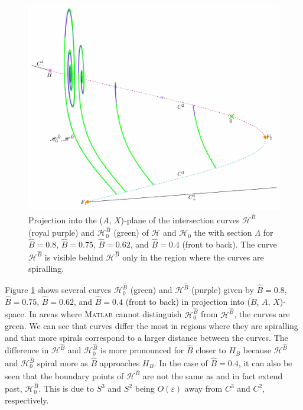 \documentclass{ws-ijbc}
\begin{document}
\begin{figure}[H]
\centering
\includegraphics[]{./figures/MKMO_15.pdf}
\caption{Projection into the ($A$, $X$)-plane of the intersection curves $\mathscr{H}^{\widehat{B}}$ (royal purple) and $\mathscr{H}_0^{\widehat{B}}$ (green) of $\mathscr{H}$ and $\mathscr{H}_0$ the with section $\Lambda$ for $\widehat{B}=0.8$, $\widehat{B}=0.75$, $\widehat{B}=0.62$, and $\widehat{B}=0.4$ (front to back).  The curve $\mathscr{H}^{\widehat{B}}$ is visible behind $\mathscr{H}^{\widehat{B}}$ only in the region where the curves are spiralling.}
\label{figure_15}
\end{figure}

Figure \ref{figure_15} shows several curves $\mathscr{H}_0^{\widehat{B}}$ (green) and $\mathscr{H}^{\widehat{B}}$ (purple) given by $\widehat{B}=0.8$, $\widehat{B}=0.75$, $\widehat{B}=0.62$, and $\widehat{B}=0.4$ (front to back) in projection into ($B$, $A$, $X$)-space.  In areas where \textsc{Matlab} cannot distinguish $\mathscr{H}_0^{\widehat{B}}$ from $\mathscr{H}^{\widehat{B}}$, the curves are green.  We can see that curves differ the most in regions where they are spiralling and that more spirals correspond to a larger distance between the curves.  The difference in $\mathscr{H}^{\widehat{B}}$ and $\mathscr{H}_0^{\widehat{B}}$ is more pronounced for $\widehat{B}$ closer to $H_B$ because $\mathscr{H}^{\widehat{B}}$ and $\mathscr{H}_0^{\widehat{B}}$ spiral more as $\widehat{B}$ approaches $H_B$.  In the case of $\widehat{B}=0.4$, it can also be seen that the boundary points of $\mathscr{H}^{\widehat{B}}$ are not the same as and in fact extend past, $\mathscr{H}_0^{\widehat{B}}$.  This is due to $S^3$ and $S^2$ being $O(\varepsilon)$ away from $C^3$ and $C^2$, respectively.
\end{document}
